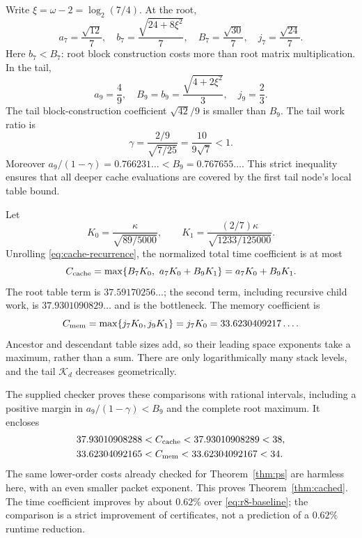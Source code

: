 Write $\xi=\omega-2=\log_2(7/4)$. At the root,
\begin{equation}\label{eq:root-cache-factors}
 a_7=\frac{\sqrt{12}}7,\quad
 b_7=\frac{\sqrt{24+8\xi^2}}7,\quad
 B_7=\frac{\sqrt{30}}7,\quad j_7=\frac{\sqrt{24}}7.
\end{equation}
Here $b_7<B_7$: root block construction costs more than root matrix
multiplication. In the tail,
\begin{equation}\label{eq:tail-cache-factors}
 a_9=\frac49,\quad
 B_9=b_9=\frac{\sqrt{4+2\xi^2}}3,\quad j_9=\frac23.
\end{equation}
The tail block-construction coefficient $\sqrt{42}/9$ is smaller than
$B_9$. The tail work ratio is
\begin{equation}\label{eq:cache-gamma}
 \gamma=\frac{2/9}{\sqrt{7/25}}=\frac{10}{9\sqrt7}<1.
\end{equation}
Moreover $a_9/(1-\gamma)=0.766231\ldots<B_9=0.767655\ldots$.
This strict inequality ensures that all deeper cache evaluations are
covered by the first tail node's local table bound.

Let
\[
 K_0=\frac{\kappa}{\sqrt{89/5000}},\qquad
 K_1=\frac{(2/7)\kappa}{\sqrt{1233/125000}}.
\]
Unrolling \eqref{eq:cache-recurrence}, the normalized total time
coefficient is at most
\begin{equation}\label{eq:cache-final}
 C_{\rm cache}=\max\{B_7K_0,\ a_7K_0+B_9K_1\}
 =a_7K_0+B_9K_1.
\end{equation}
The root table term is $37.59170256\ldots$; the second term, including
recursive child work, is $37.9301090829\ldots$ and is the bottleneck.
The memory coefficient is
\begin{equation}\label{eq:cache-memory}
 C_{\rm mem}=\max\{j_7K_0,j_9K_1\}=j_7K_0
 =33.6230409217\ldots.
\end{equation}
Ancestor and descendant table sizes add, so their leading space exponents
take a maximum, rather than a sum. There are only logarithmically many
stack levels, and the tail $\mathcal K_d$ decreases geometrically.

The supplied checker proves these comparisons with rational intervals,
including a positive margin in $a_9/(1-\gamma)<B_9$ and the complete
root maximum. It encloses
\begin{align*}
 37.93010908288&<C_{\rm cache}<37.93010908289<38,\\
 33.62304092165&<C_{\rm mem}<33.62304092167<34.
\end{align*}
The same lower-order costs already checked for Theorem~\ref{thm:ps}
are harmless here, with an even smaller packet exponent. This proves
Theorem~\ref{thm:cached}. The time coefficient improves by about $0.62\%$
over \eqref{eq:r8-baseline}; the comparison is a strict improvement of
certificates, not a prediction of a $0.62\%$ runtime reduction.

